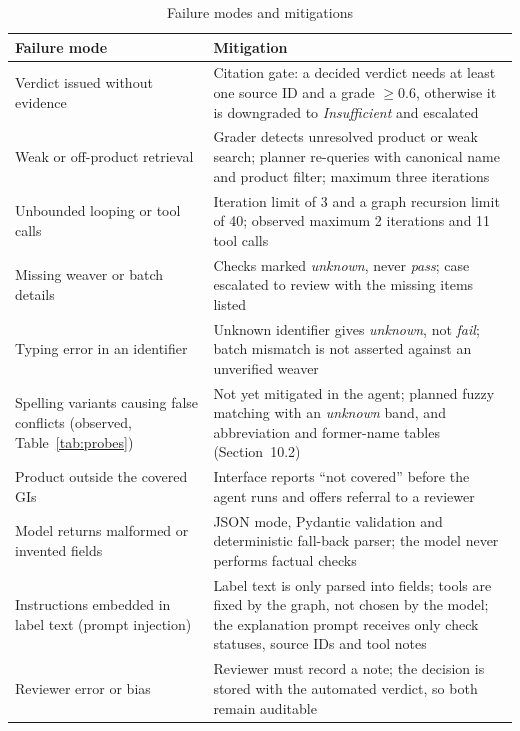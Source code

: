 \begin{table}[H]
\centering
\caption{Failure modes and mitigations}
\label{tab:failures}
\small
\begin{tabularx}{\linewidth}{@{}>{\raggedright\arraybackslash}X >{\raggedright\arraybackslash}X@{}}
\toprule
\textbf{Failure mode} & \textbf{Mitigation} \\ \midrule
Verdict issued without evidence & Citation gate: a decided verdict needs at least one source ID and a grade $\geq 0.6$, otherwise it is downgraded to \emph{Insufficient} and escalated \\
Weak or off-product retrieval & Grader detects unresolved product or weak search; planner re-queries with canonical name and product filter; maximum three iterations \\
Unbounded looping or tool calls & Iteration limit of 3 and a graph recursion limit of 40; observed maximum 2 iterations and 11 tool calls \\
Missing weaver or batch details & Checks marked \emph{unknown}, never \emph{pass}; case escalated to review with the missing items listed \\
Typing error in an identifier & Unknown identifier gives \emph{unknown}, not \emph{fail}; batch mismatch is not asserted against an unverified weaver \\
Spelling variants causing false conflicts (observed, Table~\ref{tab:probes}) & Not yet mitigated in the agent; planned fuzzy matching with an \emph{unknown} band, and abbreviation and former-name tables (Section~10.2) \\
Product outside the covered GIs & Interface reports ``not covered'' before the agent runs and offers referral to a reviewer \\
Model returns malformed or invented fields & JSON mode, Pydantic validation and deterministic fall-back parser; the model never performs factual checks \\
Instructions embedded in label text (prompt injection) & Label text is only parsed into fields; tools are fixed by the graph, not chosen by the model; the explanation prompt receives only check statuses, source IDs and tool notes \\
Reviewer error or bias & Reviewer must record a note; the decision is stored with the automated verdict, so both remain auditable \\
\bottomrule
\end{tabularx}
\end{table}

